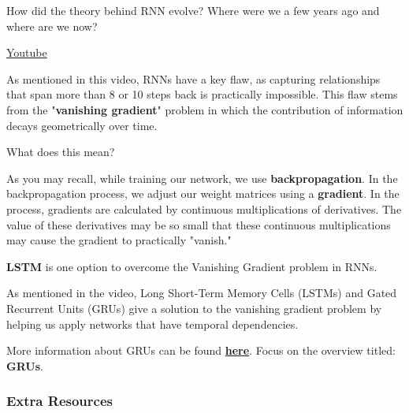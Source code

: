 How did the theory behind RNN evolve? Where were we a few years ago and where are we now? \newline

\href{https://www.youtube.com/watch?v=HbxAnYUfRnc&ab_channel=Udacity}{Youtube} \newline

As mentioned in this video, RNNs have a key flaw, as capturing relationships that span more than 8 or 10 steps back is practically impossible. This flaw stems from the "\textbf{vanishing gradient}" problem in which the contribution of information decays geometrically over time. \newline

What does this mean? \newline

As you may recall, while training our network, we use \textbf{backpropagation}. In the backpropagation process, we adjust our weight matrices using a \textbf{gradient}. In the process, gradients are calculated by continuous multiplications of derivatives. The value of these derivatives may be so small that these continuous multiplications may cause the gradient to practically "vanish." \newline

\textbf{LSTM} is one option to overcome the Vanishing Gradient problem in RNNs. \newline

As mentioned in the video, Long Short-Term Memory Cells (LSTMs) and Gated Recurrent Units (GRUs) give a solution to the vanishing gradient problem by helping us apply networks that have temporal dependencies. \newline

More information about GRUs can be found \href{https://towardsdatascience.com/understanding-gru-networks-2ef37df6c9be}{\textbf{here}}. Focus on the overview titled: \textbf{GRUs}. \newline

\subsubsection{Extra Resources}

